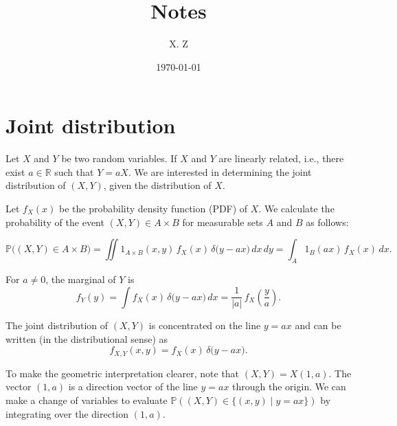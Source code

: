 \documentclass[a4paper, 12pt]{article}
\begin{document}
    \title{Notes}
    \author{X. Z}
    \date{\today}
    \maketitle

    \section{Joint distribution}

    Let $X$ and $Y$ be two random variables. If $X$ and $Y$ are linearly related, i.e., there exist $a\in \mathbb{R}$ such that $Y = aX$.
    We are interested in determining the joint distribution of $(X,Y)$, given the distribution of $X$.

    Let $f_X(x)$ be the probability density function (PDF) of $X$. We calculate the probability of the event $(X,Y) \in A \times B$ for measurable sets $A$ and $B$ as follows:

    \[
      \mathbb{P}\bigl((X,Y)\in A\times B\bigr)
      =\iint 1_{A\times B}(x,y)\, f_X(x)\,\delta\bigl(y-ax\bigr)\,dx\,dy
      =\int_A 1_B(ax)\, f_X(x)\,dx.
    \]
    
    For $a\neq 0$, the marginal of $Y$ is
    \[
      f_Y(y)=\int f_X(x)\,\delta\bigl(y-ax\bigr)\,dx
            =\frac{1}{|a|}\,f_X\!\left(\frac{y}{a}\right).
    \]

    The joint distribution of $(X,Y)$ is concentrated on the line $y=ax$ and can be written (in the distributional sense) as
    \[
      f_{X,Y}(x,y)=f_X(x)\,\delta\bigl(y-ax\bigr).
    \]

    To make the geometric interpretation clearer, note that $ (X, Y) = X(1, a)$. The vector $(1, a)$ is a direction vector of the line $y = ax$ through the origin.
    We can make a change of variables to evaluate $\mathbb{P}((X,Y) \in \{(x, y) \mid y = ax\})$ by integrating over the direction $(1, a)$.
    
    
    
\end{document}
